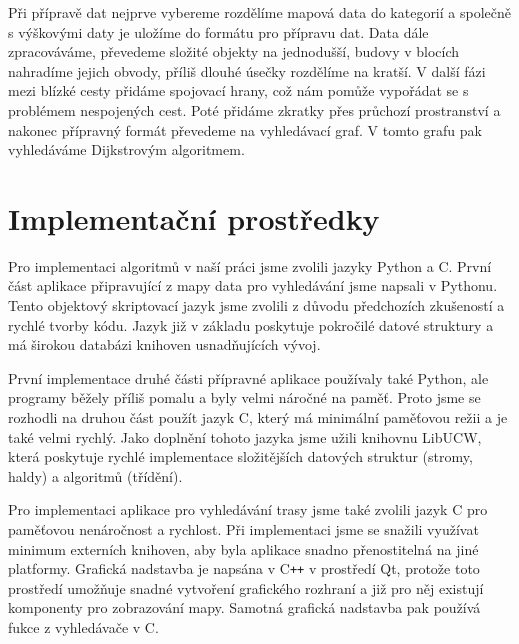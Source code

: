 Při přípravě dat nejprve vybereme rozdělíme mapová data do kategorií a společně
s výškovými daty je uložíme do formátu pro přípravu dat. Data dále zpracováváme,
převedeme složité objekty na jednodušší, budovy v blocích nahradíme jejich
obvody, příliš dlouhé úsečky rozdělíme na kratší. V další fázi mezi blízké cesty
přidáme spojovací hrany, což nám pomůže vypořádat se s problémem nespojených
cest. Poté přidáme zkratky přes průchozí prostranství a nakonec přípravný formát
převedeme na vyhledávací graf. V tomto grafu pak vyhledáváme Dijkstrovým
algoritmem.

%

\section{Implementační prostředky}
Pro implementaci algoritmů v naší práci jsme zvolili jazyky Python a C. První část
aplikace připravující z mapy data pro vyhledávání jsme napsali v Pythonu. Tento
objektový skriptovací jazyk jsme zvolili z důvodu předchozích zkušeností a
rychlé tvorby kódu. Jazyk již v základu poskytuje pokročilé datové struktury a
má širokou databázi knihoven usnadňujících vývoj. 

První implementace druhé části přípravné aplikace používaly také Python, ale programy
běžely příliš pomalu a byly velmi náročné na paměť. Proto jsme se rozhodli na
druhou část použít jazyk C, který má minimální paměťovou režii a je také velmi
rychlý. Jako doplnění tohoto jazyka jsme užili knihovnu LibUCW, která poskytuje
rychlé implementace složitějších datových struktur (stromy, haldy) a algoritmů
(třídění). 

Pro implementaci aplikace pro vyhledávání trasy jsme také zvolili jazyk C pro
paměťovou nenáročnost a rychlost. Při implementaci jsme se snažili využívat
minimum externích knihoven, aby byla aplikace snadno přenostitelná na jiné
platformy. Grafická nadstavba je napsána v C{\tt++} v prostředí Qt, protože toto
prostředí umožňuje snadné vytvoření grafického rozhraní a již pro něj existují
komponenty pro zobrazování mapy. Samotná grafická nadstavba pak používá fukce z
vyhledávače v C.


